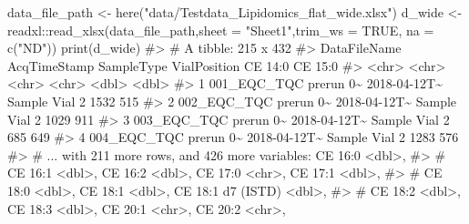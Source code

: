 \documentclass[
  letterpaper,
  DIV=11,
  numbers=noendperiod]{scrreprt}
\newenvironment{Shaded}{\begin{snugshade}}{\end{snugshade}}
\newcommand{\AttributeTok}[1]{\textcolor[rgb]{0.40,0.45,0.13}{#1}}
\newcommand{\CommentTok}[1]{\textcolor[rgb]{0.37,0.37,0.37}{#1}}
\newcommand{\ConstantTok}[1]{\textcolor[rgb]{0.56,0.35,0.01}{#1}}
\newcommand{\FunctionTok}[1]{\textcolor[rgb]{0.28,0.35,0.67}{#1}}
\newcommand{\NormalTok}[1]{\textcolor[rgb]{0.00,0.23,0.31}{#1}}
\newcommand{\OtherTok}[1]{\textcolor[rgb]{0.00,0.23,0.31}{#1}}
\newcommand{\SpecialCharTok}[1]{\textcolor[rgb]{0.37,0.37,0.37}{#1}}
\newcommand{\StringTok}[1]{\textcolor[rgb]{0.13,0.47,0.30}{#1}}
\begin{document}
\begin{Shaded}
\begin{Highlighting}[]
\NormalTok{data\_file\_path }\OtherTok{\textless{}{-}} \FunctionTok{here}\NormalTok{(}\StringTok{"data/Testdata\_Lipidomics\_flat\_wide.xlsx"}\NormalTok{)}
\NormalTok{d\_wide }\OtherTok{\textless{}{-}}\NormalTok{ readxl}\SpecialCharTok{::}\FunctionTok{read\_xlsx}\NormalTok{(data\_file\_path,}\AttributeTok{sheet =} \StringTok{"Sheet1"}\NormalTok{,}\AttributeTok{trim\_ws =} \ConstantTok{TRUE}\NormalTok{, }\AttributeTok{na =} \FunctionTok{c}\NormalTok{(}\StringTok{"ND"}\NormalTok{))}
\FunctionTok{print}\NormalTok{(d\_wide)}
\CommentTok{\#\textgreater{} \# A tibble: 215 x 432}
\CommentTok{\#\textgreater{}   DataFileName          AcqTimeStamp SampleType VialPosition \textasciigrave{}CE 14:0\textasciigrave{} \textasciigrave{}CE 15:0\textasciigrave{}}
\CommentTok{\#\textgreater{}   \textless{}chr\textgreater{}                 \textless{}chr\textgreater{}        \textless{}chr\textgreater{}      \textless{}chr\textgreater{}            \textless{}dbl\textgreater{}     \textless{}dbl\textgreater{}}
\CommentTok{\#\textgreater{} 1 001\_EQC\_TQC prerun 0\textasciitilde{} 2018{-}04{-}12T\textasciitilde{} Sample     Vial 2            1532       515}
\CommentTok{\#\textgreater{} 2 002\_EQC\_TQC prerun 0\textasciitilde{} 2018{-}04{-}12T\textasciitilde{} Sample     Vial 2            1029       911}
\CommentTok{\#\textgreater{} 3 003\_EQC\_TQC prerun 0\textasciitilde{} 2018{-}04{-}12T\textasciitilde{} Sample     Vial 2             685       649}
\CommentTok{\#\textgreater{} 4 004\_EQC\_TQC prerun 0\textasciitilde{} 2018{-}04{-}12T\textasciitilde{} Sample     Vial 2            1283       576}
\CommentTok{\#\textgreater{} \# ... with 211 more rows, and 426 more variables: \textasciigrave{}CE 16:0\textasciigrave{} \textless{}dbl\textgreater{},}
\CommentTok{\#\textgreater{} \#   \textasciigrave{}CE 16:1\textasciigrave{} \textless{}dbl\textgreater{}, \textasciigrave{}CE 16:2\textasciigrave{} \textless{}dbl\textgreater{}, \textasciigrave{}CE 17:0\textasciigrave{} \textless{}chr\textgreater{}, \textasciigrave{}CE 17:1\textasciigrave{} \textless{}dbl\textgreater{},}
\CommentTok{\#\textgreater{} \#   \textasciigrave{}CE 18:0\textasciigrave{} \textless{}dbl\textgreater{}, \textasciigrave{}CE 18:1\textasciigrave{} \textless{}dbl\textgreater{}, \textasciigrave{}CE 18:1 d7 (ISTD)\textasciigrave{} \textless{}dbl\textgreater{},}
\CommentTok{\#\textgreater{} \#   \textasciigrave{}CE 18:2\textasciigrave{} \textless{}dbl\textgreater{}, \textasciigrave{}CE 18:3\textasciigrave{} \textless{}dbl\textgreater{}, \textasciigrave{}CE 20:1\textasciigrave{} \textless{}chr\textgreater{}, \textasciigrave{}CE 20:2\textasciigrave{} \textless{}chr\textgreater{},}

\end{Highlighting}
\end{Shaded}
\end{document}
